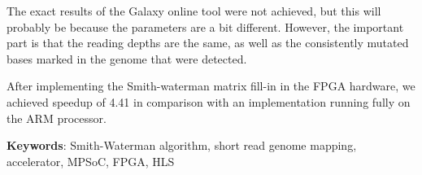 The exact results of the Galaxy online tool were not achieved, but this will probably be because the parameters are a bit different. However, the important part is that the reading depths are the same, as well as the consistently mutated bases marked in the genome that were detected.

After implementing the Smith-waterman matrix fill-in in the FPGA hardware, we achieved speedup of 4.41 in comparison with an implementation running fully on the ARM processor.

\textbf{Keywords}: Smith-Waterman algorithm, short read genome mapping, accelerator, MPSoC, FPGA, HLS